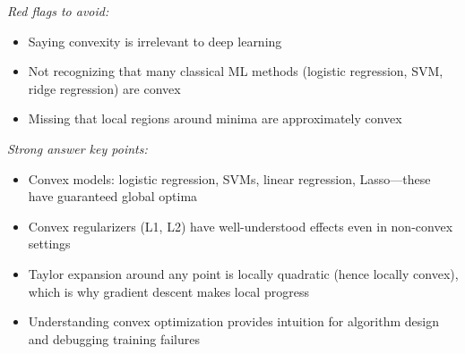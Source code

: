 \documentclass[../../main.tex]{subfiles}
\begin{document}
\begin{interviewquestions}
\textit{Red flags to avoid:}
\begin{itemize}
    \item Saying convexity is irrelevant to deep learning
    \item Not recognizing that many classical ML methods (logistic regression, SVM, ridge regression) are convex
    \item Missing that local regions around minima are approximately convex
\end{itemize}

\textit{Strong answer key points:}
\begin{itemize}
    \item Convex models: logistic regression, SVMs, linear regression, Lasso---these have guaranteed global optima
    \item Convex regularizers (L1, L2) have well-understood effects even in non-convex settings
    \item Taylor expansion around any point is locally quadratic (hence locally convex), which is why gradient descent makes local progress
    \item Understanding convex optimization provides intuition for algorithm design and debugging training failures
\end{itemize}

\end{interviewquestions}
\end{document}
